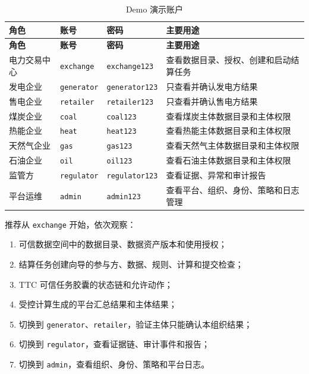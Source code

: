 \documentclass[UTF8,a4paper,zihao=-4,oneside]{ctexart}
\begin{document}
\begin{longtable}{@{}L{0.18\textwidth}L{0.18\textwidth}L{0.20\textwidth}L{0.36\textwidth}@{}}
  \caption{Demo 演示账户}\label{tab:accounts}\\
  \toprule
  \textbf{角色} & \textbf{账号} & \textbf{密码} & \textbf{主要用途} \\
  \midrule
  \endfirsthead
  \toprule
  \textbf{角色} & \textbf{账号} & \textbf{密码} & \textbf{主要用途} \\
  \midrule
  \endhead
  电力交易中心 & \texttt{exchange} & \texttt{exchange123} & 查看数据目录、授权、创建和启动结算任务 \\
  发电企业 & \texttt{generator} & \texttt{generator123} & 只查看并确认发电方结果 \\
  售电企业 & \texttt{retailer} & \texttt{retailer123} & 只查看并确认售电方结果 \\
  煤炭企业 & \texttt{coal} & \texttt{coal123} & 查看煤炭主体数据目录和主体权限 \\
  热能企业 & \texttt{heat} & \texttt{heat123} & 查看热能主体数据目录和主体权限 \\
  天然气企业 & \texttt{gas} & \texttt{gas123} & 查看天然气主体数据目录和主体权限 \\
  石油企业 & \texttt{oil} & \texttt{oil123} & 查看石油主体数据目录和主体权限 \\
  监管方 & \texttt{regulator} & \texttt{regulator123} & 查看证据、异常和审计报告 \\
  平台运维 & \texttt{admin} & \texttt{admin123} & 查看平台、组织、身份、策略和日志管理 \\
  \bottomrule
\end{longtable}

推荐从 \texttt{exchange} 开始，依次观察：

\begin{enumerate}
  \item 可信数据空间中的数据目录、数据资产版本和使用授权；
  \item 结算任务创建向导的参与方、数据、规则、计算和提交检查；
  \item TTC 可信任务胶囊的状态链和允许动作；
  \item 受控计算生成的平台汇总结果和主体结果；
  \item 切换到 \texttt{generator}、\texttt{retailer}，验证主体只能确认本组织结果；
  \item 切换到 \texttt{regulator}，查看证据链、审计事件和报告；
  \item 切换到 \texttt{admin}，查看组织、身份、策略和平台日志。
\end{enumerate}
\end{document}
